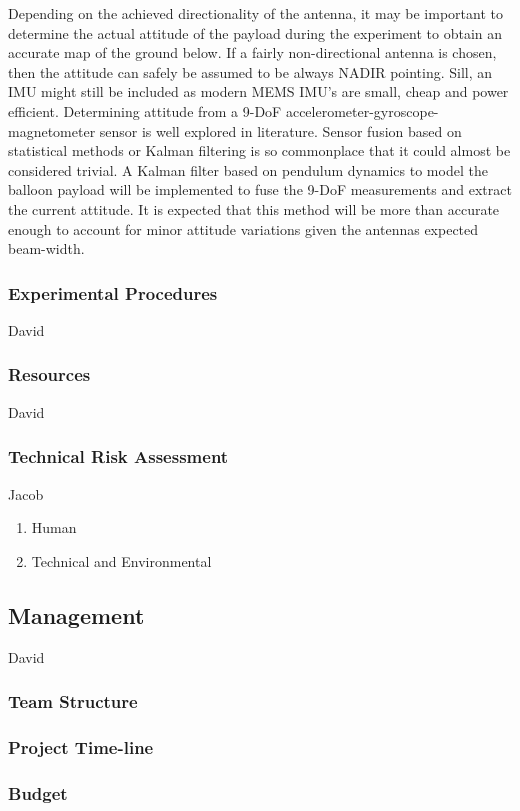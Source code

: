 \documentclass[12pt]{article}
\begin{document}
Depending on the achieved directionality of the antenna, it may be important to determine the actual attitude of the payload during the experiment to obtain an accurate map of the ground below. If a fairly non-directional antenna is chosen, then the attitude can safely be assumed to be always NADIR pointing. Sill, an IMU might still be included as modern MEMS IMU's are small, cheap and power efficient. Determining attitude from a 9-DoF accelerometer-gyroscope-magnetometer sensor is well explored in literature. Sensor fusion based on statistical methods or Kalman filtering is so commonplace that it could almost be considered trivial. A Kalman filter based on pendulum dynamics to model the balloon payload will be implemented to fuse the 9-DoF measurements and extract the current attitude. It is expected that this method will be more than accurate enough to account for minor attitude variations given the antennas expected beam-width.

\subsubsection{Experimental Procedures}
David
\subsubsection{Resources}
David
\subsubsection{Technical Risk Assessment}
Jacob
\begin{enumerate}
\item Human
\cite{omar_el-kassaby_abdelghaffar_2017}
\item Technical and Environmental
\end{enumerate}
\subsection{Management}
David
\subsubsection{Team Structure}
\subsubsection{Project Time-line}
\subsubsection{Budget}
\end{document}

